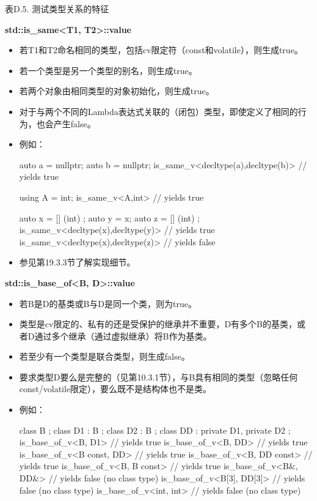 \begin{center}
表D.5. 测试类型关系的特征
\end{center}

\textbf{std::is\_same<T1, T2>::value}

\begin{itemize}
\item
若T1和T2命名相同的类型，包括cv限定符（const和volatile），则生成true。

\item
若一个类型是另一个类型的别名，则生成true。

\item
若两个对象由相同类型的对象初始化，则生成true。

\item
对于与两个不同的Lambda表达式关联的（闭包）类型，即使定义了相同的行为，也会产生false。

\item
例如：
\begin{cpp}
auto a = nullptr;
auto b = nullptr;
is_same_v<decltype(a),decltype(b)> // yields true

using A = int;
is_same_v<A,int> // yields true

auto x = [] (int) {};
auto y = x;
auto z = [] (int) {};
is_same_v<decltype(x),decltype(y)> // yields true
is_same_v<decltype(x),decltype(z)> // yields false
\end{cpp}

\item
参见第19.3.3节了解实现细节。
\end{itemize}

\textbf{std::is\_base\_of<B, D>::value}

\begin{itemize}
\item
若B是D的基类或B与D是同一个类，则为true。

\item
类型是cv限定的、私有的还是受保护的继承并不重要，D有多个B的基类，或者D通过多个继承（通过虚拟继承）将B作为基类。

\item
若至少有一个类型是联合类型，则生成false。

\item
要求类型D要么是完整的（见第10.3.1节），与B具有相同的类型（忽略任何const/volatile限定），要么既不是结构体也不是类。

\item
例如：
\begin{cpp}
class B {
};
class D1 : B {
};
class D2 : B {
};
class DD : private D1, private D2 {
};
is_base_of_v<B, D1> // yields true
is_base_of_v<B, DD> // yields true
is_base_of_v<B const, DD> // yields true
is_base_of_v<B, DD const> // yields true
is_base_of_v<B, B const> // yields true
is_base_of_v<B&, DD&> // yields false (no class type)
is_base_of_v<B[3], DD[3]> // yields false (no class type)
is_base_of_v<int, int> // yields false (no class type)
\end{cpp}
\end{itemize}

